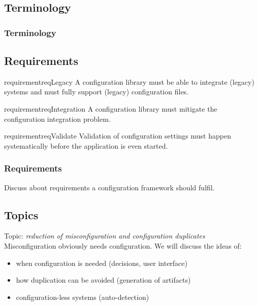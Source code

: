 \documentclass{beamer}
\begin{document}
\subsection{Terminology}
\begin{frame}
	\frametitle{Terminology}
	
\end{frame}

\subsection{Requirements}
\begin{frame}
\begin{restatable}{requirement}{reqLegacy}
A configuration library must be able to integrate (legacy) systems and must fully support (legacy) configuration files.%
\label{req:legacy}
\end{restatable}

\begin{restatable}{requirement}{reqIntegration}
A configuration library must mitigate the configuration integration problem.%
\label{req:integration}
\end{restatable}

\begin{restatable}{requirement}{reqValidate}
Validation of configuration settings must happen systematically before the application is even started.
\end{restatable}
\end{frame}

\begin{assignment}
	\frametitle{Requirements}
	\begin{task}
	Discuss about requirements a configuration framework should fulfil.
	\end{task}
\end{assignment}

\subsection{Topics}
\begin{frame}
	Topic: \textit{reduction of misconfiguration and configuration duplicates} \\
	Misconfiguration obviously needs configuration.
	We will discuss the ideas of:
	\begin{itemize}
		\item when configuration is needed (decisions, user interface)
		\item how duplication can be avoided (generation of artifacts)
		\item configuration-less systems (auto-detection)
	\end{itemize}
\end{frame}
\end{document}
